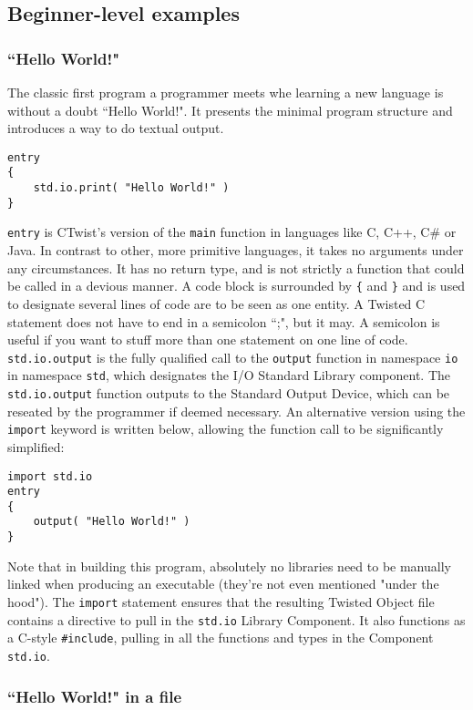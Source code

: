 \documentclass[a4paper,11pt]{article}
\newcommand{\tcode}[1]{\texttt{#1}}
\begin{document}
  \subsection{Beginner-level examples}

    \subsubsection{``Hello World!"}

The classic first program a programmer meets whe learning a new language is without a doubt ``Hello World!".
It presents the minimal program structure and introduces a way to do textual output.
\begin{lstlisting}
entry
{
    std.io.print( "Hello World!" )
}
\end{lstlisting}
\lstinline|entry| is CTwist's version of the \lstinline|main| function in languages like C, C++, C\# or Java.
In contrast to other, more primitive languages, it takes no arguments under any circumstances.
It has no return type, and is not strictly a function that could be called in a devious manner.
A code block is surrounded by \tcode{\{} and \tcode{\}} and is used to designate several lines of code are to be seen as one entity.
A Twisted C statement does not have to end in a semicolon ``;", but it may.
A semicolon is useful if you want to stuff more than one statement on one line of code.
\tcode{std.io.output} is the fully qualified call to the \tcode{output} function in namespace \tcode{io} in namespace \tcode{std}, which designates the I/O Standard Library component.
The \tcode{std.io.output} function outputs to the Standard Output Device, which can be reseated by the programmer if deemed necessary.
An alternative version using the \tcode{import} keyword is written below, allowing the function call to be significantly simplified:
\begin{lstlisting}
import std.io
entry
{
    output( "Hello World!" )
}
\end{lstlisting}
Note that in building this program, absolutely no libraries need to be manually linked when producing an executable (they're not even mentioned "under the hood").
The \tcode{import} statement ensures that the resulting Twisted Object file contains a directive to pull in the \tcode{std.io} Library Component.
It also functions as a C-style \tcode{\#include}, pulling in all the functions and types in the Component \tcode{std.io}.

    \subsubsection{``Hello World!" in a file}
\end{document}
